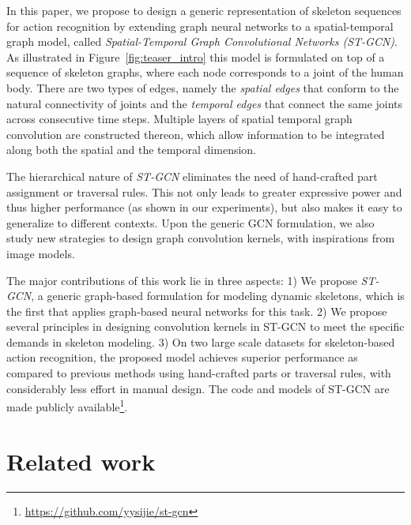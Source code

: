 \documentclass[letterpaper]{article} %
\begin{document}
In this paper, we propose to design a generic representation of skeleton
sequences for action recognition by extending graph neural networks
to a spatial-temporal graph model,
called \emph{Spatial-Temporal Graph Convolutional Networks (ST-GCN)}.
As illustrated in Figure~\ref{fig:teaser_intro}
this model is formulated on top of a sequence of skeleton graphs,
where each node corresponds to a joint of the human body. There are
two types of edges, namely the \emph{spatial edges} that conform to the
natural connectivity of joints and the \emph{temporal edges} that
connect the same joints across consecutive time steps.
Multiple layers of spatial temporal graph convolution
are constructed thereon, which allow information to be integrated
along both the spatial and the temporal dimension.

The hierarchical nature of \emph{ST-GCN} eliminates the need of hand-crafted
part assignment or traversal rules. This not only leads to greater
expressive power and thus higher performance (as shown in our experiments),
but also makes it easy to generalize to different contexts.
Upon the generic GCN formulation, we also study new strategies to
design graph convolution kernels, with inspirations from image models.

The major contributions of this work lie in three aspects:
1) We propose \emph{ST-GCN}, a generic graph-based formulation
for modeling dynamic skeletons, which is the first that applies graph-based
neural networks for this task.
2) We propose several principles in designing convolution kernels in ST-GCN
to meet the specific demands in skeleton modeling.
3) On two large scale datasets for skeleton-based action
recognition, the proposed model achieves superior performance
as compared to previous methods using hand-crafted parts or traversal rules, with considerably less effort in manual design.
The code and models of ST-GCN are made publicly available\footnote{\url{https://github.com/yysijie/st-gcn}}.

\section{Related work}
\end{document}
